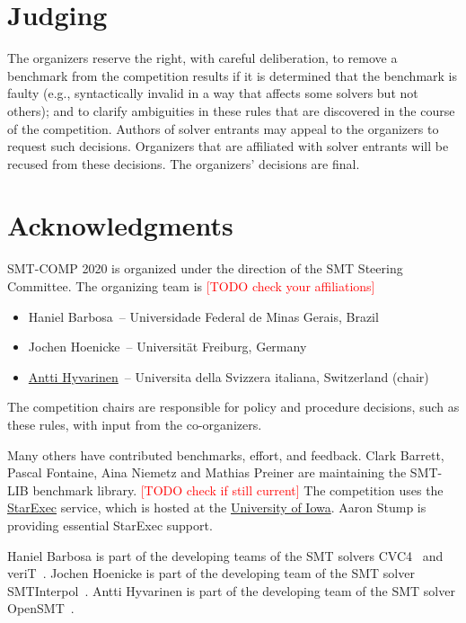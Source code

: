 \documentclass[12pt]{article}
\newcommand{\rem}[1]{\textcolor{red}{[#1]}}
\newcommand{\todo}[1]{\rem{TODO #1}}
\begin{document}

\section{Judging}

The organizers reserve the right, with careful deliberation, to remove
a benchmark from the competition results if it is determined that the
benchmark is faulty (e.g., syntactically invalid in a way that affects
some solvers but not others); and to clarify ambiguities in these
rules that are discovered in the course of the competition.  Authors
of solver entrants may appeal to the organizers to request such
decisions.  Organizers that are affiliated with solver entrants will
be recused from these decisions.  The organizers' decisions are final.


\section{Acknowledgments}

SMT-COMP 2020 is organized under the direction of the SMT Steering
Committee. The organizing team is
%
\todo{check your affiliations}
\begin{itemize}
\setlength{\itemsep}{0pt}
\item Haniel Barbosa~-- Universidade Federal de Minas Gerais, Brazil
\item Jochen Hoenicke~-- Universit\"at Freiburg, Germany
\item \href{http://www.inf.usi.ch/postdoc/hyvarinen/}{Antti Hyvarinen}~--
		Universita della Svizzera italiana, Switzerland (chair)
\end{itemize}
%
The competition chairs are responsible for policy and procedure decisions,
such as these rules, with input from the co-organizers.

Many others have contributed benchmarks, effort, and feedback.  Clark Barrett,
Pascal Fontaine, Aina Niemetz and Mathias Preiner are maintaining the SMT-LIB
benchmark library. \todo{check if still current}
The competition uses the
\href{https://www.starexec.org/}{StarExec} service, which is hosted at
the \href{http://www.cs.uiowa.edu/}{University of Iowa}.  Aaron Stump
is providing essential StarExec support.

%
Haniel Barbosa is part of the developing teams of the SMT solvers
CVC4~\cite{cvc4-smtcomp18} and veriT~\cite{verit}.
%
Jochen Hoenicke is part of the developing team of the SMT solver
SMTInterpol~\cite{smtinterpol}.
Antti Hyvarinen is part of the developing team of the SMT solver
OpenSMT~\cite{opensmt2}.


\pagebreak



\end{document}
